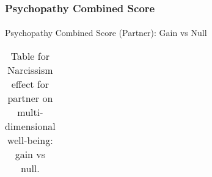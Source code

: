 \documentclass[
  singlecolumn]{article}
\makeatletter
\let\oldparagraph\paragraph
\renewcommand{\paragraph}{
    \@ifstar
      \xxxParagraphStar
      \xxxParagraphNoStar
  }
\newcommand{\xxxParagraphStar}[1]{\oldparagraph*{#1}\mbox{}}
\newcommand{\xxxParagraphNoStar}[1]{\oldparagraph{#1}\mbox{}}
\makeatother
\begin{document}
\subsubsection{Psychopathy Combined
Score}\label{psychopathy-combined-score}

\paragraph{Psychopathy Combined Score (Partner): Gain vs
Null}\label{psychopathy-combined-score-partner-gain-vs-null}

\begin{longtable}[]{@{}
  >{\raggedright\arraybackslash}p{}
  >{\raggedleft\arraybackslash}p{}
  >{\raggedleft\arraybackslash}p{}
  >{\raggedleft\arraybackslash}p{}
  >{\raggedleft\arraybackslash}p{}
  >{\raggedleft\arraybackslash}p{}@{}}

\caption{\label{tbl-results-psychopathy_combined_partner-null-gain}Table
for Narcissism effect for partner on multi-dimensional well-being: gain
vs null.}

\tabularnewline


\end{longtable}
\end{document}
